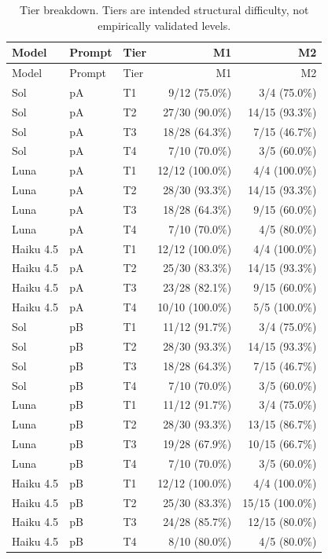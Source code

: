 \documentclass[11pt,a4paper]{article}
\begin{document}
\begingroup\small\setlength{\tabcolsep}{4pt}
\begin{longtable}{lllrr}
\caption{Tier breakdown. Tiers are intended structural difficulty, not empirically validated levels.}\\
\toprule
Model & Prompt & Tier & M1 & M2 \\
\midrule\endfirsthead
\toprule
Model & Prompt & Tier & M1 & M2 \\
\midrule\endhead
\bottomrule\endfoot
Sol & pA & T1 & 9/12 (75.0\%) & 3/4 (75.0\%) \\
Sol & pA & T2 & 27/30 (90.0\%) & 14/15 (93.3\%) \\
Sol & pA & T3 & 18/28 (64.3\%) & 7/15 (46.7\%) \\
Sol & pA & T4 & 7/10 (70.0\%) & 3/5 (60.0\%) \\
Luna & pA & T1 & 12/12 (100.0\%) & 4/4 (100.0\%) \\
Luna & pA & T2 & 28/30 (93.3\%) & 14/15 (93.3\%) \\
Luna & pA & T3 & 18/28 (64.3\%) & 9/15 (60.0\%) \\
Luna & pA & T4 & 7/10 (70.0\%) & 4/5 (80.0\%) \\
Haiku 4.5 & pA & T1 & 12/12 (100.0\%) & 4/4 (100.0\%) \\
Haiku 4.5 & pA & T2 & 25/30 (83.3\%) & 14/15 (93.3\%) \\
Haiku 4.5 & pA & T3 & 23/28 (82.1\%) & 9/15 (60.0\%) \\
Haiku 4.5 & pA & T4 & 10/10 (100.0\%) & 5/5 (100.0\%) \\
Sol & pB & T1 & 11/12 (91.7\%) & 3/4 (75.0\%) \\
Sol & pB & T2 & 28/30 (93.3\%) & 14/15 (93.3\%) \\
Sol & pB & T3 & 18/28 (64.3\%) & 7/15 (46.7\%) \\
Sol & pB & T4 & 7/10 (70.0\%) & 3/5 (60.0\%) \\
Luna & pB & T1 & 11/12 (91.7\%) & 3/4 (75.0\%) \\
Luna & pB & T2 & 28/30 (93.3\%) & 13/15 (86.7\%) \\
Luna & pB & T3 & 19/28 (67.9\%) & 10/15 (66.7\%) \\
Luna & pB & T4 & 7/10 (70.0\%) & 3/5 (60.0\%) \\
Haiku 4.5 & pB & T1 & 12/12 (100.0\%) & 4/4 (100.0\%) \\
Haiku 4.5 & pB & T2 & 25/30 (83.3\%) & 15/15 (100.0\%) \\
Haiku 4.5 & pB & T3 & 24/28 (85.7\%) & 12/15 (80.0\%) \\
Haiku 4.5 & pB & T4 & 8/10 (80.0\%) & 4/5 (80.0\%) \\
\end{longtable}\endgroup
\end{document}

